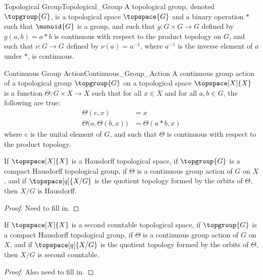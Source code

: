 \documentclass{article}                                                        %
\begin{document}
            \begin{fdefinition}{Topological Group}{Topological_Group}
                A topological group, denoted $\topgroup{G}$, is a topological space
                $\topspace{G}$ and a binary operation $*$ such that $\monoid{G}$ is
                a group, and such that $g:G\times{G}\rightarrow{G}$ defined by
                $g(a,b)=a*b$ is continuous with respect to the product topology on
                $G$, and such that $\nu:G\rightarrow{G}$ defined by
                $\nu(a)=a^{\minus{1}}$, where $a^{\minus{1}}$ is the inverse element
                of $a$ under $*$, is continuous.
            \end{fdefinition}
            \begin{fdefinition}{Continuous Group Action}{Continuous_Group_Action}
                A continuous group action of a topological group $\topgroup{G}$
                on a topological space $\topspace[X]{X}$ is a function
                $\Theta:G\times{X}\rightarrow{X}$ such that for all $x\in{X}$ and
                for all $a,b\in{G}$, the following are true:
                \begin{align*}
                    \Theta(e,x)&=x\\
                    \Theta\big(a,\Theta(b,x)\big)&=\Theta(a*b,x)
                \end{align*}
                where $e$ is the unital element of $G$, and such that $\Theta$ is
                continuous with respect to the product topology.
            \end{fdefinition}
            \begin{theorem}
                \label{thm:Quotient_by_Compact_T2_Group_Preserves_T2}%
                If $\topspace[X]{X}$ is a Hausdorff topological space, if
                $\topgroup{G}$ is a compact Hausdorff topological group, if
                $\Theta$ is a continuous group action of $G$ on $X$, and if
                $\topspace[q]{X/G}$ is the quotient topology formed by the orbits
                of $\Theta$, then $X/G$ is Hausdorff.
            \end{theorem}
            \begin{proof}
                Need to fill in.
            \end{proof}
            \begin{theorem}
                \label{thm:Quotient_by_Compact_T2_Group_Preserves_Sec_Count}%
                If $\topspace[X]{X}$ is a second countable topological space, if
                $\topgroup{G}$ is a compact Hausdorff topological group, if
                $\Theta$ is a continuous group action of $G$ on $X$, and if
                $\topspace[q]{X/G}$ is the quotient topology formed by the orbits
                of $\Theta$, then $X/G$ is second countable.
            \end{theorem}
            \begin{proof}
                Also need to fill in.
            \end{proof}
\end{document}
